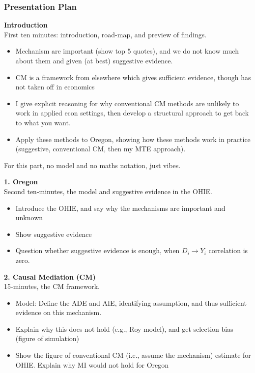 \documentclass[dvipsnames,handout]{beamer} %
\begin{document}
\begin{frame}
    \frametitle{Presentation Plan}
    \textbf{Introduction} \\
    First ten minutes: introduction, road-map, and preview of findings.
    \begin{itemize}
        \item Mechanism are important (show top 5 quotes), and we do not know much about them and given (at best) suggestive evidence.
        \item CM is a framework from elsewhere which gives sufficient evidence, though has not taken off in economics
        \item I give explicit reasoning for why conventional CM methods are unlikely to work in applied econ settings, then develop a structural approach to get back to what you want.
        \item Apply these methods to Oregon, showing how these methods work in practice (suggestive, conventional CM, then my MTE approach).
    \end{itemize}
    For this part, no model and no maths notation, just vibes.

    \textbf{1. Oregon} \\
    Second ten-minutes, the model and suggestive evidence in the OHIE.
    \begin{itemize}
        \item Introduce the OHIE, and say why the mechanisms are important and unknown
        \item Show suggestive evidence
        \item Question whether suggestive evidence is enough, when $D_i \to Y_i$ correlation is zero. 
    \end{itemize}

    \textbf{2. Causal Mediation (CM)} \\
    15-minutes, the CM framework. 
    \begin{itemize}
        \item Model: Define the ADE and AIE, identifying assumption, and thus sufficient evidence on this mechanism.
        \item Explain why this does not hold (e.g., Roy model), and get selection bias (figure of simulation)
        \item Show the figure of conventional CM (i.e., assume the mechanism) estimate for OHIE.  Explain why MI would not hold for Oregon
    \end{itemize}


\end{frame}
\end{document}
